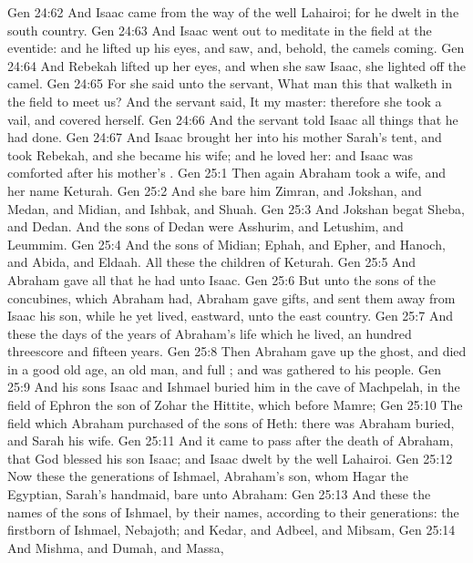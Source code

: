 \vs Gen 24:62 And Isaac came from the way of the well Lahairoi; for he dwelt in the south country.
\vs Gen 24:63 And Isaac went out to meditate in the field at the eventide: and he lifted up his eyes, and saw, and, behold, the camels  coming.
\vs Gen 24:64 And Rebekah lifted up her eyes, and when she saw Isaac, she lighted off the camel.
\vs Gen 24:65 For she  said unto the servant, What man  this that walketh in the field to meet us? And the servant  said, It  my master: therefore she took a vail, and covered herself.
\vs Gen 24:66 And the servant told Isaac all things that he had done.
\vs Gen 24:67 And Isaac brought her into his mother Sarah's tent, and took Rebekah, and she became his wife; and he loved her: and Isaac was comforted after his mother's .
\vs Gen 25:1 Then again Abraham took a wife, and her name  Keturah.
\vs Gen 25:2 And she bare him Zimran, and Jokshan, and Medan, and Midian, and Ishbak, and Shuah.
\vs Gen 25:3 And Jokshan begat Sheba, and Dedan. And the sons of Dedan were Asshurim, and Letushim, and Leummim.
\vs Gen 25:4 And the sons of Midian; Ephah, and Epher, and Hanoch, and Abida, and Eldaah. All these  the children of Keturah.
\vs Gen 25:5 And Abraham gave all that he had unto Isaac.
\vs Gen 25:6 But unto the sons of the concubines, which Abraham had, Abraham gave gifts, and sent them away from Isaac his son, while he yet lived, eastward, unto the east country.
\vs Gen 25:7 And these  the days of the years of Abraham's life which he lived, an hundred threescore and fifteen years.
\vs Gen 25:8 Then Abraham gave up the ghost, and died in a good old age, an old man, and full ; and was gathered to his people.
\vs Gen 25:9 And his sons Isaac and Ishmael buried him in the cave of Machpelah, in the field of Ephron the son of Zohar the Hittite, which  before Mamre;
\vs Gen 25:10 The field which Abraham purchased of the sons of Heth: there was Abraham buried, and Sarah his wife.
\vs Gen 25:11 And it came to pass after the death of Abraham, that God blessed his son Isaac; and Isaac dwelt by the well Lahairoi.
\vs Gen 25:12 Now these  the generations of Ishmael, Abraham's son, whom Hagar the Egyptian, Sarah's handmaid, bare unto Abraham:
\vs Gen 25:13 And these  the names of the sons of Ishmael, by their names, according to their generations: the firstborn of Ishmael, Nebajoth; and Kedar, and Adbeel, and Mibsam,
\vs Gen 25:14 And Mishma, and Dumah, and Massa,
